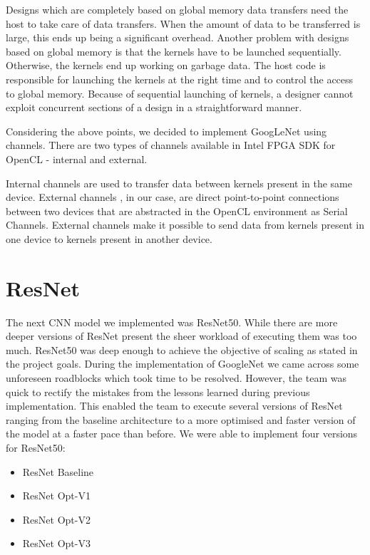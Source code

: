Designs which are completely based on global memory data transfers need the host to take care of data transfers. When the amount of data to be transferred is large, this ends up being a significant overhead. Another problem with designs based on global memory is that the kernels have to be launched sequentially. Otherwise, the kernels end up working on garbage data. The host code is responsible for launching the kernels at the right time and to control the access to global memory. Because of sequential launching of kernels, a designer cannot exploit concurrent sections of a design in a straightforward manner. 

Considering the above points, we decided to implement GoogLeNet using channels. There are two types of channels available in Intel FPGA SDK for OpenCL - internal and external.

Internal channels are used to transfer data between kernels present in the same device. External channels , in our case, are direct point-to-point connections between two devices that are abstracted in the OpenCL environment as Serial Channels. External channels make it possible to send data from kernels present in one device to kernels present in another device. 





























\section{ResNet}
The next CNN model we implemented was ResNet50. While there are more deeper versions of ResNet present the sheer workload of executing them was too much. ResNet50 was deep enough to achieve the objective of scaling as stated in the project goals. During the implementation of GoogleNet we came across some unforeseen roadblocks which took time to be resolved. However, the team was quick to rectify the mistakes from the lessons learned during previous implementation. This enabled the team to execute several versions of ResNet ranging from the baseline architecture to a more optimised and faster version of the model at a faster pace than before.
We were able to implement four versions for ResNet50:
\begin{itemize}
    \item ResNet Baseline
    \item ResNet Opt-V1
    \item ResNet Opt-V2
    \item ResNet Opt-V3
\end{itemize}

